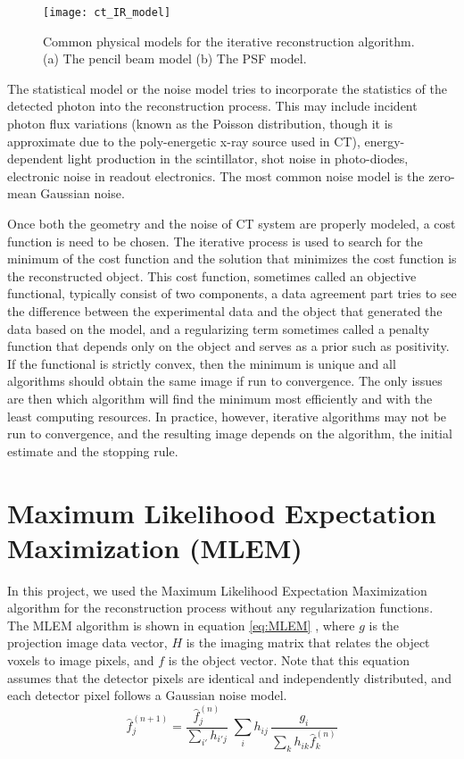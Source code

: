 \begin{figure}
\texttt{[image: ct\_IR\_model]}
\caption{Common physical models for the iterative reconstruction algorithm. (a) The pencil beam model (b) The PSF model.}
\label{fig:physical_modeling}
\end{figure}

The statistical model or the noise model tries to incorporate the statistics of the detected photon into the reconstruction process.  This may include incident photon flux variations (known as the Poisson distribution, though it is approximate due to the poly-energetic x-ray source used in CT), energy-dependent light production in the scintillator, shot noise in photo-diodes, electronic noise in readout electronics. The most common noise model is the zero-mean Gaussian noise.

Once both the geometry and the noise of CT system are properly modeled, a cost function is need to be chosen.  The iterative process is used to search for the minimum of the cost function and the solution that minimizes the cost function is the reconstructed object.  This cost function, sometimes called an objective functional, typically consist of two components, a data agreement part tries to see the difference between the experimental data and the object that generated the data based on the model, and a regularizing term sometimes called a penalty function that depends only on the object and serves as a prior such as positivity.  If the functional is strictly convex, then the minimum is unique and all algorithms should obtain the same image if run to convergence.  The only issues are then which algorithm will find the minimum most efficiently and with the least computing resources.  In practice, however, iterative algorithms may not be run to convergence, and the resulting image depends on the algorithm, the initial estimate and the stopping rule.

\section{Maximum Likelihood Expectation Maximization (MLEM) }
In this project, we used the Maximum Likelihood Expectation Maximization algorithm for the reconstruction process without any regularization functions.  The MLEM algorithm is shown in equation \ref{eq:MLEM} \citep{EmissionTom2004}, where $g$ is the projection image data vector, $H$ is the imaging matrix that relates the object voxels to image pixels, and $f$ is the object vector.  Note that this equation assumes that the detector pixels are identical and independently distributed, and each detector pixel follows a Gaussian noise model. 
\begin{equation}
\hat{f}^{(n+1)}_{j} = \frac{\hat{f}^{(n)}_j}{{\sum\limits_{i'}} h_{i'j}} \; 
						\sum\limits_{i} h_{ij} \, \frac{g_{i}}{\sum\limits_{k} h_{ik} \hat{f}_{k}^{(n)}}
\label{eq:MLEM}
\end{equation}


